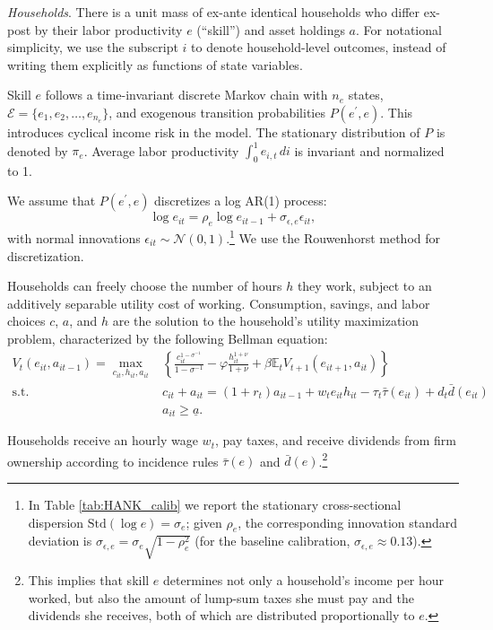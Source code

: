 \documentclass[a4paper,12pt]{article}%
\begin{document}
\emph{Households}. There is a unit mass of ex-ante identical households who differ ex-post by their labor productivity \( e \) (``skill'') and asset holdings \( a \). For notational simplicity, we use the subscript \( i \) to denote household-level outcomes, instead of writing them explicitly as functions of state variables.

Skill \( e \) follows a time-invariant discrete Markov chain with \( n_e \) states, \( \mathcal{E} = \{e_1, e_2, \ldots, e_{n_e}\} \), and exogenous transition probabilities \( P(e^{\prime}, e) \). This introduces cyclical income risk in the model. The stationary distribution of \( P \) is denoted by \( \pi_e \). Average labor productivity \( \int_0^1 e_{i,t} \, di \) is invariant and normalized to 1.

We assume that \( P(e^{\prime}, e) \) discretizes a log AR(1) process:
\[
\log e_{i t} = \rho_e \log e_{i t-1} + \sigma_{\epsilon,e} \epsilon_{i t},
\]
with normal innovations \( \epsilon_{i t} \sim \mathcal{N}(0,1) \).\footnote{In Table \ref{tab:HANK_calib} we report the stationary cross-sectional dispersion \( \text{Std}(\log e) = \sigma_e \); given \( \rho_e \), the corresponding innovation standard deviation is \( \sigma_{\epsilon,e} = \sigma_e \sqrt{1-\rho_e^2} \) (for the baseline calibration, \( \sigma_{\epsilon,e}\approx 0.13 \)).} We use the Rouwenhorst method for discretization.

Households can freely choose the number of hours \( h \) they work, subject to an additively separable utility cost of working. Consumption, savings, and labor choices \( c \), \( a \), and \( h \) are the solution to the household's utility maximization problem, characterized by the following Bellman equation:
\[
\begin{aligned}
V_t\left(e_{i t}, a_{i t-1}\right) = \max_{c_{i t}, h_{i t}, a_{i t}} & \left\{ \frac{c_{i t}^{1 - \sigma^{-1}}}{1 - \sigma^{-1}} - \varphi \frac{h_{i t}^{1 + \nu}}{1 + \nu} + \beta \mathbb{E}_t V_{t+1}\left(e_{i t+1}, a_{i t}\right) \right\} \\
\text{s.t.} \quad & c_{i t} + a_{i t} = (1 + r_t) a_{i t-1} + w_t e_{i t} h_{i t} - \tau_t \bar{\tau}(e_{i t}) + d_t \bar{d}(e_{i t}) \\
& a_{i t} \geq \underline{a}.
\end{aligned}
\]

Households receive an hourly wage \( w_t \), pay taxes, and receive dividends from firm ownership according to incidence rules \( \bar{\tau}(e) \) and \( \bar{d}(e) \).\footnote{
This implies that skill \( e \) determines not only a household's income per hour worked, but also the amount of lump-sum taxes she must pay and the dividends she receives, both of which are distributed proportionally to \( e \).}
\end{document}
